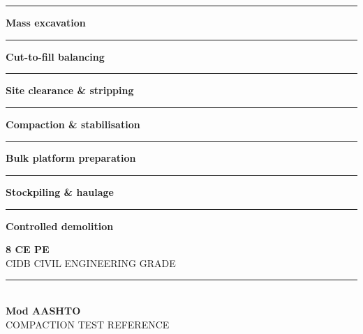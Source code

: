 \documentclass[a4paper,11pt]{article}
\begin{document}
\begin{minipage}[t]{0.34\textwidth}
    \vspace{0pt}
    \begin{tcolorbox}[
        enhanced,colback=mhoffwhite,colframe=mhnavy,boxrule=1pt,arc=4pt,
        title={\bfseries\color{white}\faTractor\ Earthworks Scope of Work},
        colbacktitle=mhnavy,left=7pt,right=7pt,top=6pt,bottom=6pt,
        drop shadow=black!6]
        \fontsize{8.1pt}{11.6pt}\selectfont
        \textcolor{mhnavy}{\rule{4pt}{4pt}}\hspace{4pt}\textbf{Mass excavation}\\
        \textcolor{mhnavy}{\rule{4pt}{4pt}}\hspace{4pt}\textbf{Cut-to-fill balancing}\\
        \textcolor{mhnavy}{\rule{4pt}{4pt}}\hspace{4pt}\textbf{Site clearance \& stripping}\\
        \textcolor{mhnavy}{\rule{4pt}{4pt}}\hspace{4pt}\textbf{Compaction \& stabilisation}\\
        \textcolor{mhnavy}{\rule{4pt}{4pt}}\hspace{4pt}\textbf{Bulk platform preparation}\\
        \textcolor{mhnavy}{\rule{4pt}{4pt}}\hspace{4pt}\textbf{Stockpiling \& haulage}\\
        \textcolor{mhnavy}{\rule{4pt}{4pt}}\hspace{4pt}\textbf{Controlled demolition}
    \end{tcolorbox}

    \vspace{0.20cm}

    \begin{tcolorbox}[
        enhanced,colback=white,colframe=mhlightgray,boxrule=0.8pt,arc=4pt,
        left=6pt,right=6pt,top=6pt,bottom=6pt,halign=center,
        drop shadow=black!4]
        {\fontsize{18pt}{20pt}\selectfont\bfseries\color{mhblue}8 CE PE}\\[1pt]
        {\fontsize{7.4pt}{9pt}\selectfont\color{mhtextmuted}%
        \MakeUppercase{CIDB Civil Engineering Grade}}\\[4pt]
        \textcolor{mhlightgray}{\rule{3.2cm}{0.6pt}}\\[4pt]
        {\fontsize{13pt}{15pt}\selectfont\bfseries\color{mhnavy}Mod AASHTO}\\[1pt]
        {\fontsize{7.2pt}{9pt}\selectfont\color{mhtextmuted}%
        \MakeUppercase{Compaction Test Reference}}
    \end{tcolorbox}
\end{minipage}
\end{document}
